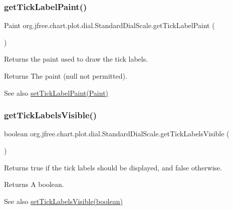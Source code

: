 \subsubsection{\texorpdfstring{get\+Tick\+Label\+Paint()}{getTickLabelPaint()}}
{\footnotesize\ttfamily Paint org.\+jfree.\+chart.\+plot.\+dial.\+Standard\+Dial\+Scale.\+get\+Tick\+Label\+Paint (\begin{DoxyParamCaption}{ }\end{DoxyParamCaption})}

Returns the paint used to draw the tick labels.

\begin{DoxyReturn}{Returns}
The paint ({\ttfamily null} not permitted).
\end{DoxyReturn}
\begin{DoxySeeAlso}{See also}
\mbox{\hyperlink{classorg_1_1jfree_1_1chart_1_1plot_1_1dial_1_1_standard_dial_scale_a9328a314f07c55da46004bf450bc9627}{set\+Tick\+Label\+Paint(\+Paint)}} 
\end{DoxySeeAlso}
\mbox{\label{classorg_1_1jfree_1_1chart_1_1plot_1_1dial_1_1_standard_dial_scale_af28005e1d3f175d9fb695830299d9852}} 
\subsubsection{\texorpdfstring{get\+Tick\+Labels\+Visible()}{getTickLabelsVisible()}}
{\footnotesize\ttfamily boolean org.\+jfree.\+chart.\+plot.\+dial.\+Standard\+Dial\+Scale.\+get\+Tick\+Labels\+Visible (\begin{DoxyParamCaption}{ }\end{DoxyParamCaption})}

Returns {\ttfamily true} if the tick labels should be displayed, and {\ttfamily false} otherwise.

\begin{DoxyReturn}{Returns}
A boolean.
\end{DoxyReturn}
\begin{DoxySeeAlso}{See also}
\mbox{\hyperlink{classorg_1_1jfree_1_1chart_1_1plot_1_1dial_1_1_standard_dial_scale_a24d62a6c1edcfb5c5969fcb338231fe9}{set\+Tick\+Labels\+Visible(boolean)}} 
\end{DoxySeeAlso}
\mbox{\label{classorg_1_1jfree_1_1chart_1_1plot_1_1dial_1_1_standard_dial_scale_a6180a42bb175a95a1636ae3d050f3983}} 
